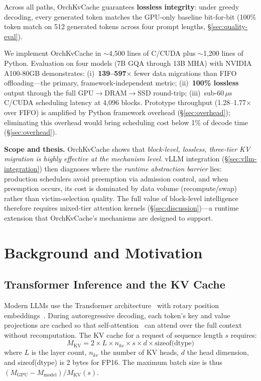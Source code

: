 \documentclass[conference]{IEEEtran}
\begin{document}
Across all paths, OrchKvCache guarantees \textbf{lossless integrity}: under greedy decoding, every generated token matches the GPU-only baseline bit-for-bit (100\% token match on 512 generated tokens across four prompt lengths, \S\ref{sec:quality-eval}).

We implement OrchKvCache in ${\sim}$4,500 lines of C/CUDA plus ${\sim}$1,200 lines of Python. Evaluation on four models (7B GQA through 13B MHA) with NVIDIA A100-80GB demonstrates: (i)~\textbf{139--597$\times$} fewer data migrations than FIFO offloading---the primary, framework-independent metric; (ii)~\textbf{100\% lossless} output through the full GPU$\to$DRAM$\to$SSD round-trip; (iii)~sub-60\,$\mu$s C/CUDA scheduling latency at 4,096 blocks. Prototype throughput (1.28--1.77$\times$ over FIFO) is amplified by Python framework overhead (\S\ref{sec:overhead}); eliminating this overhead would bring scheduling cost below 1\% of decode time (\S\ref{sec:overhead}).

\textbf{Scope and thesis.} OrchKvCache shows that \emph{block-level, lossless, three-tier KV migration is highly effective at the mechanism level}. vLLM integration (\S\ref{sec:vllm-integration}) then diagnoses where the \emph{runtime abstraction barrier} lies: production schedulers avoid preemption via admission control, and when preemption occurs, its cost is dominated by data volume (recompute/swap) rather than victim-selection quality. The full value of block-level intelligence therefore requires mixed-tier attention kernels (\S\ref{sec:discussion})---a runtime extension that OrchKvCache's mechanisms are designed to support.

\section{Background and Motivation}
\subsection{Transformer Inference and the KV Cache}

Modern LLMs use the Transformer architecture~\cite{transformer} with rotary position embeddings~\cite{rope}. During autoregressive decoding, each token's key and value projections are cached so that self-attention~\cite{transformer} can attend over the full context without recomputation. The KV cache for a request of sequence length $s$ requires:
\begin{equation}
M_{\text{KV}} = 2 \times L \times n_{kv} \times s \times d \times \text{sizeof(dtype)}
\label{eq:kv-mem}
\end{equation}
where $L$ is the layer count, $n_{kv}$ the number of KV heads, $d$ the head dimension, and sizeof(dtype) is 2 bytes for FP16. The maximum batch size is thus $(M_{\text{GPU}} - M_{\text{model}}) / M_{\text{KV}}(s)$.
\end{document}
